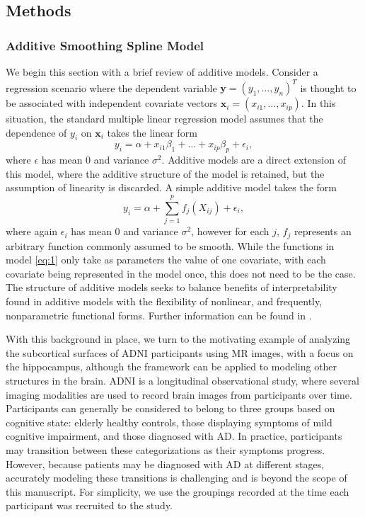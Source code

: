 \documentclass[11pt,reqno]{article}
\theoremstyle{definition}
\begin{document}
\subsection{Methods}\label{s:methods}

\subsubsection{Additive Smoothing Spline Model}

We begin this section with a brief review of additive models. Consider a regression scenario where the dependent variable $\mathbf{y} = \left(y_1, \dots, y_n\right)^{T}$ is thought to be associated with independent covariate vectors $\mathbf{x}_i = \left(x_{i1}, \dots, x_{ip}\right)$. In this situation, the standard multiple linear regression model assumes that the dependence of $y_i$ on $\mathbf{x}_i$ takes the linear form
\[%
  y_i = \alpha + x_{i1}\beta_1 + \dots + x_{ip}\beta_p + \epsilon_i
,\]%
where $\epsilon$ has mean 0 and variance $\sigma^2$. Additive models are a direct extension of this model, where the additive structure of the model is retained, but the assumption of linearity is discarded. A simple additive model takes the form
\begin{equation}
  y_i = \alpha + \sum_{j=1}^{p}f_j(X_{ij}) + \epsilon_i, \label{eq:1}
\end{equation}
where again $\epsilon_i$ has mean 0 and variance $\sigma^2$, however for each $j$, $f_j$ represents an arbitrary function commonly assumed to be smooth. While the functions in model \ref{eq:1} only take as parameters the value of one covariate, with each covariate being represented in the model once, this does not need to be the case. The structure of additive models seeks to balance benefits of interpretability found in additive models with the flexibility of nonlinear, and frequently, nonparametric functional forms. Further information can be found in \cite{hastieGeneralizedAdditiveModels1990}.

With this background in place, we turn to the motivating example of analyzing the subcortical surfaces of ADNI participants using MR images, with a focus on the hippocampus, although the framework can be applied to modeling other structures in the brain. ADNI is a longitudinal observational study, where several imaging modalities are used to record brain images from participants over time. Participants can generally be considered to belong to three groups based on cognitive state: elderly healthy controls, those displaying symptoms of mild cognitive impairment, and those diagnosed with AD. In practice, participants may transition between these categorizations as their symptoms progress. However, because patients may be diagnosed with AD at different stages, accurately modeling these transitions is challenging and is beyond the scope of this manuscript. For simplicity, we use the groupings recorded at the time each participant was recruited to the study. 
\end{document}
